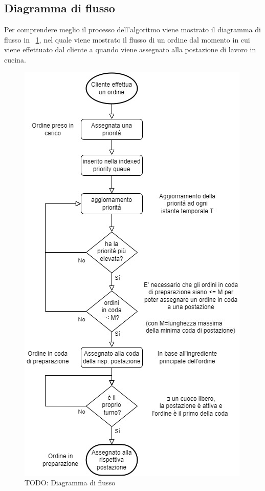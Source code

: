 \subsection{Diagramma di flusso}
Per comprendere meglio il processo dell’algoritmo viene mostrato il diagramma di flusso in \figurename~\ref{fig:flowchart}, nel quale viene mostrato il flusso di un ordine dal momento in cui viene effettuato dal cliente a quando viene assegnato alla postazione di lavoro in cucina.
\begin{figure}[htbp]
	\centering
	\includegraphics[scale=0.7]{iterazione2/images/flowchart.jpg}
	\caption{TODO: Diagramma di flusso\label{fig:flowchart}}
\end{figure}

\clearpage